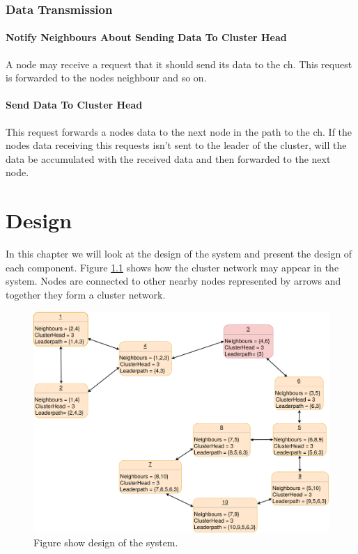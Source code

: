 \documentclass[USenglish]{uit-thesis}
\begin{document}
\subsection{Data Transmission}
\subsubsection{Notify Neighbours About Sending Data To Cluster Head}
A node may receive a request that it should send its data to the \gls{ch}. This request is forwarded to the nodes neighbour and so on.

\subsubsection{Send Data To Cluster Head}
This request forwards a nodes data to the next node in the path to the \gls{ch}. If the nodes data receiving this requests isn't sent to the leader of the cluster, will the data be accumulated with the received data and then forwarded to the next node.



\chapter{Design}
In this chapter we will look at the design of the system and present the design of each component. Figure \ref{fig:design} shows how the cluster network may appear in the system. Nodes are connected to other nearby nodes represented by arrows and together they form a cluster network.

\begin{figure}
\centering
\includegraphics[width=\textwidth]{design.png}
\caption{Figure show design of the system.}
\label{fig:design}
\end{figure}
\end{document}
